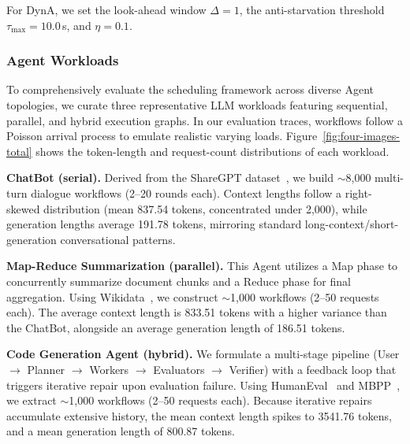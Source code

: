 \documentclass[sigconf,review,anonymous]{acmart}
\begin{document}
For DynA, we set the look-ahead window $\Delta=1$, the anti-starvation
threshold $\tau_{\max}=10.0$\,s, and $\eta=0.1$.

\subsubsection{Agent Workloads}
To comprehensively evaluate the scheduling framework across diverse Agent topologies, 
we curate three representative LLM workloads featuring sequential, parallel, 
and hybrid execution graphs. In our evaluation traces, workflows follow a Poisson arrival 
process to emulate realistic varying loads.
Figure~\ref{fig:four-images-total} shows the token-length and
request-count distributions of each workload.

\textbf{ChatBot (serial).}
Derived from the ShareGPT dataset~\cite{chiang2023vicuna}, we build $\sim$8,000 multi-turn 
dialogue workflows (2--20 rounds each). Context lengths follow a right-skewed distribution
 (mean 837.54 tokens, concentrated under 2,000), while generation lengths average 191.78 
 tokens, mirroring standard long-context/short-generation conversational patterns.

\textbf{Map-Reduce Summarization (parallel).}
This Agent utilizes a Map phase to concurrently summarize document chunks and a Reduce 
phase for final aggregation. Using Wikidata~\cite{vrandevcic2014wikidata}, we construct 
$\sim$1,000 workflows (2--50 requests each). The average context length is 833.51 tokens 
with a higher variance than the ChatBot, alongside an average generation length of 186.51 
tokens.

\textbf{Code Generation Agent (hybrid).}
We formulate a multi-stage pipeline (User $\to$ Planner $\to$ Workers $\to$ Evaluators 
$\to$ Verifier) with a feedback loop that triggers iterative repair upon evaluation failure.
 Using HumanEval~\cite{chen2021evaluating} and MBPP~\cite{austin2021program}, we extract 
 $\sim$1,000 workflows (2--50 requests each). Because iterative repairs accumulate 
 extensive history, the mean context length spikes to 3541.76 tokens, and a mean generation
  length of 800.87 tokens.
\end{document}
